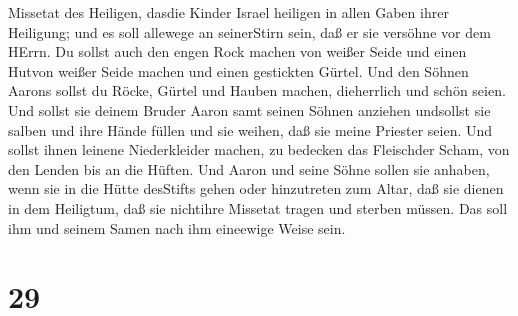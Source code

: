 Missetat des Heiligen, dasdie Kinder Israel heiligen in allen Gaben
ihrer Heiligung; und es soll allewege an seinerStirn sein, daß er sie
versöhne vor dem HErrn.  Du sollst auch den engen Rock
machen von weißer Seide und einen Hutvon weißer Seide machen und einen
gestickten Gürtel.  Und den Söhnen Aarons sollst du Röcke,
Gürtel und Hauben machen, dieherrlich und schön seien.  Und
sollst sie deinem Bruder Aaron samt seinen Söhnen anziehen undsollst sie
salben und ihre Hände füllen und sie weihen, daß sie meine Priester
seien.  Und sollst ihnen leinene Niederkleider machen, zu
bedecken das Fleischder Scham, von den Lenden bis an die Hüften.
 Und Aaron und seine Söhne sollen sie anhaben, wenn sie in
die Hütte desStifts gehen oder hinzutreten zum Altar, daß sie dienen in
dem Heiligtum, daß sie nichtihre Missetat tragen und sterben müssen. Das
soll ihm und seinem Samen nach ihm eineewige Weise sein.

\hypertarget{section-28}{%
\section{29}\label{section-28}}


